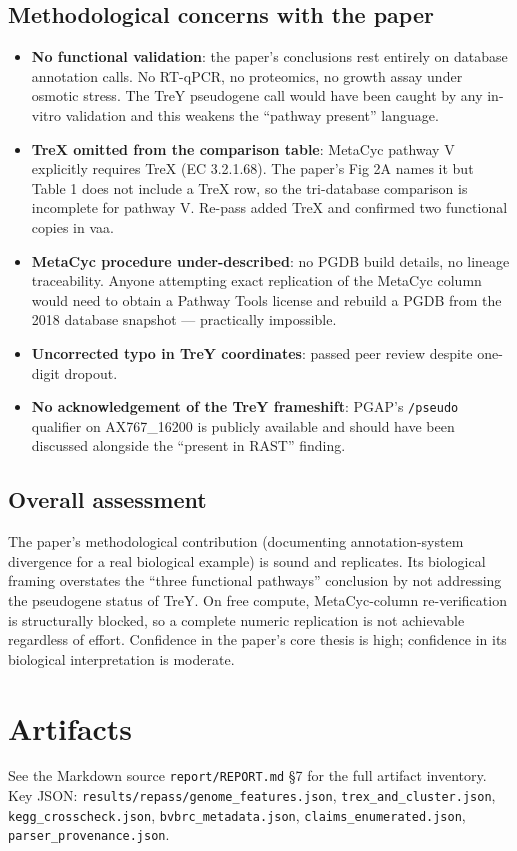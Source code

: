 \documentclass[11pt,letterpaper]{article}
\begin{document}
\subsection*{Methodological concerns with the paper}
\begin{itemize}[leftmargin=1.2em,itemsep=1pt]
  \item \textbf{No functional validation}: the paper's conclusions rest entirely on database annotation calls. No RT-qPCR, no proteomics, no growth assay under osmotic stress. The TreY pseudogene call would have been caught by any in-vitro validation and this weakens the ``pathway present'' language.
  \item \textbf{TreX omitted from the comparison table}: MetaCyc pathway V explicitly requires TreX (EC 3.2.1.68). The paper's Fig 2A names it but Table 1 does not include a TreX row, so the tri-database comparison is incomplete for pathway V. Re-pass added TreX and confirmed two functional copies in vaa.
  \item \textbf{MetaCyc procedure under-described}: no PGDB build details, no lineage traceability. Anyone attempting exact replication of the MetaCyc column would need to obtain a Pathway Tools license and rebuild a PGDB from the 2018 database snapshot --- practically impossible.
  \item \textbf{Uncorrected typo in TreY coordinates}: passed peer review despite one-digit dropout.
  \item \textbf{No acknowledgement of the TreY frameshift}: PGAP's \texttt{/pseudo} qualifier on AX767\_16200 is publicly available and should have been discussed alongside the ``present in RAST'' finding.
\end{itemize}

\subsection*{Overall assessment}
The paper's methodological contribution (documenting annotation-system divergence for a real biological example) is sound and replicates. Its biological framing overstates the ``three functional pathways'' conclusion by not addressing the pseudogene status of TreY. On free compute, MetaCyc-column re-verification is structurally blocked, so a complete numeric replication is not achievable regardless of effort. Confidence in the paper's core thesis is high; confidence in its biological interpretation is moderate.

\section{Artifacts}
See the Markdown source \texttt{report/REPORT.md} \S 7 for the full artifact inventory. Key JSON:
\texttt{results/repass/genome\_features.json}, \texttt{trex\_and\_cluster.json},
\texttt{kegg\_crosscheck.json}, \texttt{bvbrc\_metadata.json},
\texttt{claims\_enumerated.json}, \texttt{parser\_provenance.json}.
\end{document}
